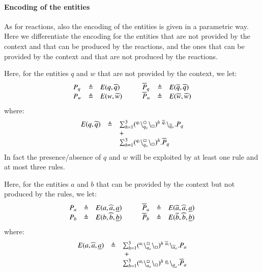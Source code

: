 \paragraph{Encoding of the entities}
As for reactions, also the encoding of the entities is given in a parametric way.
Here we differentiate the encoding for the entities that are not provided by the context and that can be produced by the reactions, and the ones that can be provided by the context and that are not produced by the reactions.

Here, for the entities $q$ and $w$ that are not provided by the context, we let:
\[
\begin{array}{lcl@{\hspace{1cm}}lcl}
P_q & \defeq & E(q,\widetilde{q}) & \overline{P}_q & \defeq & E(\overline{q},\widetilde{q}) \\
P_w& \defeq & E(w,\widetilde{w}) & \overline{P}_w & \defeq & E(\overline{w},\widetilde{w})
\end{array}
\]
where:
\[
\begin{array}{lcl}
E(q,\widetilde{q})&\defeq & \sum_{h=1}^3 (\startchain{q_i}\chainedlink{q_o}{\noact}\chainend{\noact})^h\ \link{\widetilde{q}_i}{\widetilde{q}_o}.P_q\\
&& +\\
&& \sum_{h=1}^3 (\startchain{q_i}\chainedlink{q_o}{\noact}\chainend{\noact})^h.\overline{P}_q\\
\end{array}
\]
In fact the presence/absence of $q$ and $w$ will be exploited by at least one rule and at most three rules.


Here, for the entities $a$ and $b$ that can be provided by the context but not produced by the rules, we let:
\[
\begin{array}{lcl@{\hspace{1cm}}lcl}
P_a & \defeq & E(a,\widehat{a},\underline{a}) & 
\overline{P}_a & \defeq & E(\overline{a},\widehat{a},\underline{a}) \\
P_b& \defeq & E(b,\widehat{b},\underline{b})&
\overline{P}_b& \defeq & E(\overline{b},\widehat{b},\underline{b})
\end{array}
\]
where:
\[
\begin{array}{rcl}
 E(a,\widehat{a},\underline{a}) & \defeq &\sum_{h=1}^3  
  (\startchain{a_i}\chainedlink{a_o}{\noact}\chainend{\noact})^h \ \startchain{\widehat{a}_i}\chainend{\widehat{a}_o}.P_a\\
&&\ + \\
&&
\sum_{h=1}^3
 (\startchain{a_i}\chainedlink{a_o}{\noact}\chainend{\noact})^h \ \startchain{\underline{a}_i}\chainend{\underline{a}_o}.\overline{P}_a
\end{array}
\]


